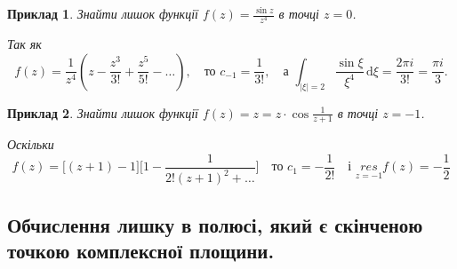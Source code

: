 \documentclass[12pt,fleqn]{article}
\newtheorem{exm}{Приклад}[section]
\theoremstyle{theorem}
\theoremstyle{proof}
\numberwithin{figure}{section}
\numberwithin{equation}{section}
\begin{document}
\begin{exm}\label{exm.15.1.2}
Знайти лишок функції $f(z)=\frac{\sin z}{z^4}$ в точці $z=0$.

Так як
\[f(z)=\frac{1}{z^4}(z-\frac{z^3}{3!}+\frac{z^5}{5!}-\dots),\quad \text{то }c_{-1}=\frac{1}{3!}, \quad\text{а } \int_{|\xi|=2}\frac{\sin \xi}{{\xi}^4}\,\mathrm{d}\xi=\frac{2\pi i}{3!}=\frac{\pi i}{3}.\]
\end{exm}

\begin{exm}\label{exm.15.1.3}
Знайти лишок функції $f(z)=z=z\cdot\cos\frac{1}{z+1}$ в точці $z=-1$.

Оскільки
\[f(z)=\big[(z+1)-1\big] \big[1-\frac{1}{2!(z+1)^2+\dots}\big]\quad \text{то } c_1=-\frac{1}{2!} \quad\text{і } \underset{z=-1}{res}f(z)=-\frac{1}{2}\]
\end{exm}

\subsection{Обчислення лишку в полюсі, який є скінченою точкою комплексної площини.}
\end{document}
